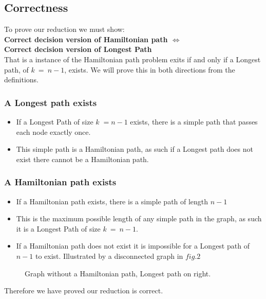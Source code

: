 \documentclass[a4paper,11pt]{article}
\begin{document}
\subsection{Correctness}
To prove our reduction we must show:\\
\textbf{Correct decision version of Hamiltonian path $\Longleftrightarrow$ 
\\Correct decision version of Longest Path}\\
That is a instance of the Hamiltonian path problem exits if and only if a 
Longest path, of $k\:=\:n-1$, exists. We will prove this in both directions 
from the definitions. 
\subsubsection{A Longest path exists}
\begin{itemize}
    \item If a Longest Path of size $k\;=n-1$ exists, there is a simple path 
    that passes each node exactly once.
    \item This simple path is a Hamiltonian path, as such if a Longest path does
     not exist there cannot be a Hamiltonian path.
\end{itemize}
\subsubsection{A Hamiltonian path exists}
\begin{itemize}
    \item If a Hamiltonian path exists, there is a simple path of length $n-1$
    \item This is the maximum possible length of any simple path in the graph,
    as such it is a Longest Path of size $k\:=\:n-1$.
    \item If a Hamiltonian path does not exist it is impossible for a Longest 
    path of $n-1$ to exist. Illustrated by a disconnected graph in $fig.2$
\end{itemize}
\begin{figure}[!h]
        \centering {}
        \caption{Graph without a Hamiltonian path, Longest path on right.}
    \end{figure}
Therefore we have proved our reduction is correct.
\end{document}
